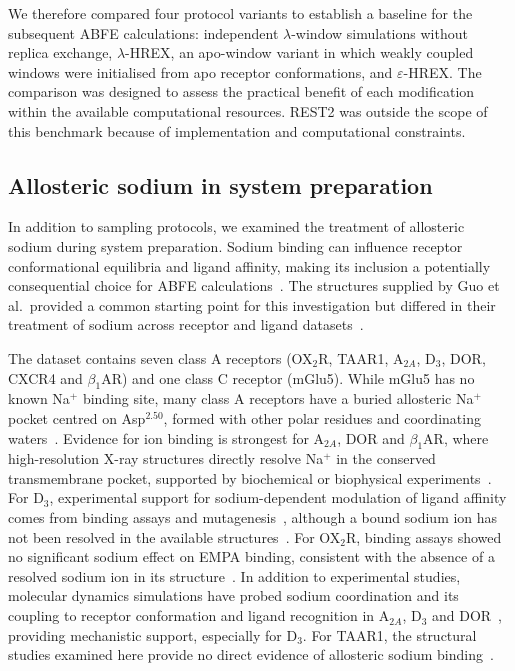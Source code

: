 We therefore compared four protocol variants to establish a baseline for the subsequent ABFE calculations: independent $\lambda$-window simulations without replica exchange, $\lambda$-HREX, an apo-window variant in which weakly coupled windows were initialised from apo receptor conformations, and $\varepsilon$-HREX. The comparison was designed to assess the practical benefit of each modification within the available computational resources. REST2 was outside the scope of this benchmark because of implementation and computational constraints. 

\subsection{Allosteric sodium in system preparation}

In addition to sampling protocols, we examined the treatment of allosteric sodium during system preparation. Sodium binding can influence receptor conformational equilibria and ligand affinity, making its inclusion a potentially consequential choice for ABFE calculations~\cite{liu2012structural,katritch2014allosteric}. The structures supplied by Guo et al.\ provided a common starting point for this investigation but differed in their treatment of sodium across receptor and ligand datasets~\cite{guo2023benchmark,anand2026improving}.

The dataset contains seven class A receptors (OX$_2$R, TAAR1, A$_{2A}$, D$_3$, DOR, CXCR4 and $\beta_1$AR) and one class C receptor (mGlu5). While mGlu5 has no known Na$^{+}$ binding site, many class A receptors have a buried allosteric Na$^{+}$ pocket centred on Asp$^{2.50}$, formed with other polar residues and coordinating waters~\cite{katritch2014allosteric}. Evidence for ion binding is strongest for A$_{2A}$, DOR and $\beta_1$AR, where high-resolution X-ray structures directly resolve Na$^{+}$ in the conserved transmembrane pocket, supported by biochemical or biophysical experiments~\cite{liu2012structural,fenalti2014molecular,miller2014sodium}. For D$_3$, experimental support for sodium-dependent modulation of ligand affinity comes from binding assays and mutagenesis~\cite{newton2016examining}, although a bound sodium ion has not been resolved in the available structures~\cite{chien2010structure,anand2026improving}. For OX$_2$R, binding assays showed no significant sodium effect on EMPA binding, consistent with the absence of a resolved sodium ion in its structure~\cite{suno2018crystal}. In addition to experimental studies, molecular dynamics simulations have probed sodium coordination and its coupling to receptor conformation and ligand recognition in A$_{2A}$, D$_3$ and DOR~\cite{gutierrez2013role,michino2015structural,shang2014mechanistic}, providing mechanistic support, especially for D$_3$. For TAAR1, the structural studies examined here provide no direct evidence of allosteric sodium binding~\cite{zilberg2024molecular}.


